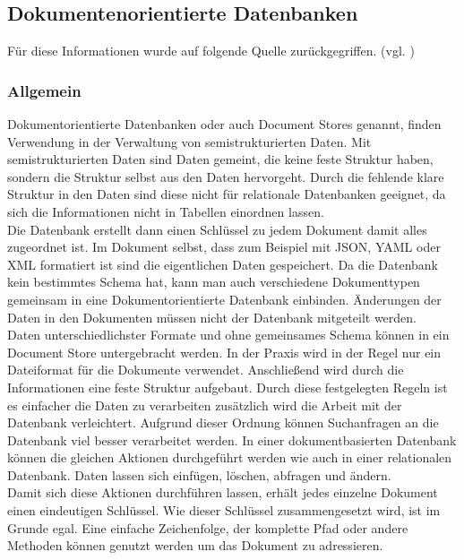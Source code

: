 \subsection{Dokumentenorientierte Datenbanken}
Für diese Informationen wurde auf folgende Quelle zurückgegriffen. (vgl. \cite{ionis_dokumentenorientierte_2020})
\subsubsection{Allgemein}
Dokumentorientierte Datenbanken oder auch Document Stores genannt, finden Verwendung in der Verwaltung von semistrukturierten Daten. Mit semistrukturierten Daten sind Daten gemeint, die keine feste Struktur haben, sondern die Struktur selbst aus den Daten hervorgeht. Durch die fehlende klare Struktur in den Daten sind diese nicht für relationale Datenbanken geeignet, da sich die Informationen nicht in Tabellen einordnen lassen.\\

Die Datenbank erstellt dann einen Schlüssel zu jedem Dokument damit alles zugeordnet ist. Im Dokument selbst, dass zum Beispiel mit JSON, YAML oder XML formatiert ist sind die eigentlichen Daten gespeichert. Da die Datenbank kein bestimmtes Schema hat, kann man auch verschiedene Dokumenttypen gemeinsam in eine Dokumentorientierte Datenbank einbinden. Änderungen der Daten in den Dokumenten müssen nicht der Datenbank mitgeteilt werden.\\
 
Daten unterschiedlichster Formate und ohne gemeinsames Schema können in ein Document Store untergebracht werden. In der Praxis wird in der Regel nur ein Dateiformat für die Dokumente verwendet. Anschließend wird durch die Informationen eine feste Struktur aufgebaut. Durch diese festgelegten Regeln ist es einfacher die Daten zu verarbeiten zusätzlich wird die Arbeit mit der Datenbank verleichtert. Aufgrund dieser Ordnung können Suchanfragen an die Datenbank viel besser verarbeitet werden. In einer dokumentbasierten Datenbank können die gleichen Aktionen durchgeführt werden wie auch in einer relationalen Datenbank. Daten lassen sich einfügen, löschen, abfragen und ändern.\\
 
Damit sich diese Aktionen durchführen lassen, erhält jedes einzelne Dokument einen eindeutigen Schlüssel. Wie dieser Schlüssel zusammengesetzt wird, ist im Grunde egal. Eine einfache Zeichenfolge, der komplette Pfad oder andere Methoden können genutzt werden um das Dokument zu adressieren.
\newpage
